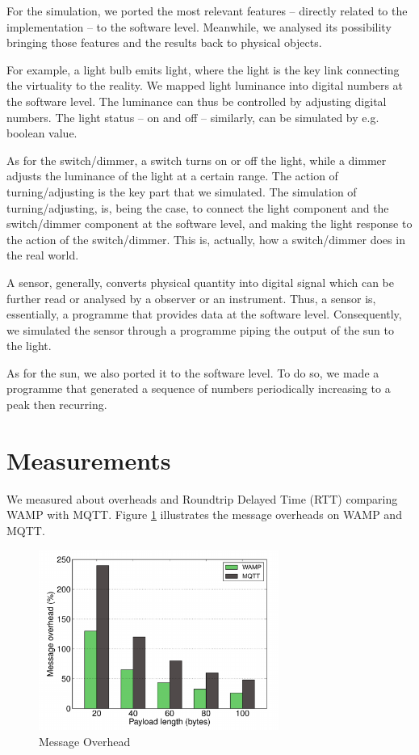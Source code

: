 For the simulation, we ported the most relevant features -- directly related to the implementation -- to the software level. Meanwhile, we analysed its possibility bringing those features and the results back to physical objects. 

For example, a light bulb emits light, where the light is the key link connecting the virtuality to the reality. We mapped light luminance into digital numbers at the software level. The luminance can thus be controlled by adjusting digital numbers. The light status -- on and off -- similarly, can be simulated by e.g. boolean value. 

As for the switch/dimmer, a switch turns on or off the light, while a dimmer adjusts the luminance of the light at a certain range. The action of turning/adjusting is the key part that we simulated. The simulation of turning/adjusting, is, being the case, to connect the light component and the switch/dimmer component at the software level, and making the light response to the action of the switch/dimmer. This is, actually, how a switch/dimmer does in the real world.

A sensor, generally, converts physical quantity into digital signal which can be further read or analysed by a observer or an instrument. Thus, a sensor is, essentially, a programme that provides data at the software level. Consequently, we simulated the sensor through a programme piping the output of the sun to the light.

As for the sun, we also ported it to the software level. To do so, we made a programme that generated a sequence of numbers periodically increasing to a peak then recurring.

\section{Measurements}
We measured about overheads and Roundtrip Delayed Time (RTT) comparing WAMP with MQTT. Figure \ref{fig:overhead} illustrates the message overheads on WAMP and MQTT.

\begin{figure}[t]
  \begin{center}
    \includegraphics[width=0.7\textwidth]{images/overhead.pdf}
    \caption{Message Overhead}
    \label{fig:overhead}
  \end{center}
\end{figure}

